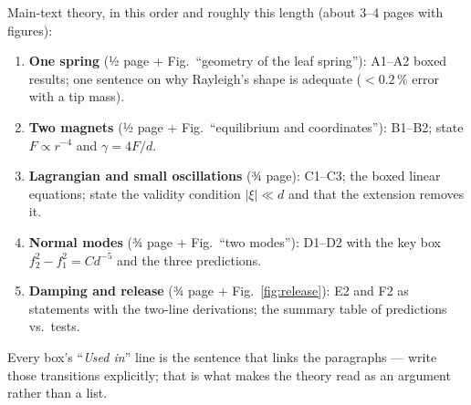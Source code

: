 \documentclass[11pt,a4paper]{article}
\begin{document}
\begin{writebox}
Main-text theory, in this order and roughly this length (about 3--4 pages with figures):
\begin{enumerate}
\item \textbf{One spring} (½ page + Fig.~``geometry of the leaf spring''): A1--A2 boxed results; one sentence on why Rayleigh's shape is adequate ($<0.2\,\%$ error with a tip mass).
\item \textbf{Two magnets} (½ page + Fig.~``equilibrium and coordinates''): B1--B2; state $F\propto r^{-4}$ and $\gamma=4F/d$.
\item \textbf{Lagrangian and small oscillations} (¾ page): C1--C3; the boxed linear equations; state the validity condition $|\xi|\ll d$ and that the extension removes it.
\item \textbf{Normal modes} (¾ page + Fig.~``two modes''): D1--D2 with the key box $f_2^2-f_1^2=Cd^{-5}$ and the three predictions.
\item \textbf{Damping and release} (¾ page + Fig.~\ref{fig:release}): E2 and F2 as statements with the two-line derivations; the summary table of predictions vs.\ tests.
\end{enumerate}
Every box's ``\textit{Used in}'' line is the sentence that links the paragraphs --- write those transitions explicitly; that is what makes the theory read as an argument rather than a list.
\end{writebox}

\newpage
\end{document}
